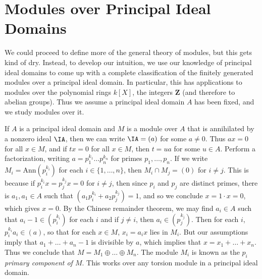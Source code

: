 \section{Modules over Principal Ideal Domains}

We could proceed to define more of the general theory of modules, but this gets kind of dry. Instead, to develop our intuition, we use our knowledge of principal ideal domains to come up with a complete classification of the finitely generated modules over a principal ideal domain. In particular, this has applications to modules over the polynomial rings $k[X]$, the integers $\mathbf{Z}$ (and therefore to abelian groups). Thus we assume a principal ideal domain $A$ has been fixed, and we study modules over it.

If $A$ is a principal ideal domain and $M$ is a module over $A$ that is annihilated by a nonzero ideal $\IA$, then we can write $\IA = (a)$ for some $a \neq 0$. Thus $ax = 0$ for all $x \in M$, and if $tx = 0$ for all $x \in M$, then $t = ua$ for some $u \in A$. Perform a factorization, writing $a = p_1^{k_1} \dots p_n^{k_n}$ for primes $p_1, \dots, p_n$. If we write $M_i = \text{Ann}(p_i^{k_i})$ for each $i \in \{ 1, \dots, n \}$, then $M_i \cap M_j = (0)$ for $i \neq j$. This is because if $p_i^{k_i} x = p_j^{k_j} x = 0$ for $i \neq j$, then since $p_i$ and $p_j$ are distinct primes, there is $a_1,a_1 \in A$ such that $(a_1 p_i^{k_i} + a_2 p_j^{k_j}) = 1$, and so we conclude $x = 1 \cdot x = 0$, which gives $x = 0$. By the Chinese remainder theorem, we may find $a_i \in A$ such that $a_i - 1 \in (p_i^{k_i})$ for each $i$ and if $j \neq i$, then $a_i \in (p_j^{k_j})$. Then for each $i$, $p_i^{k_i} a_i \in (a)$, so that for each $x \in M$, $x_i = a_i x$ lies in $M_i$. But our assumptions imply that $a_1 + \dots + a_n - 1$ is divisible by $a$, which implies that $x = x_1 + \dots + x_n$. Thus we conclude that $M = M_1 \oplus \dots \oplus M_n$. The module $M_i$ is known as the \emph{$p_i$ primary component of $M$}. This works over any torsion module in a principal ideal domain.

